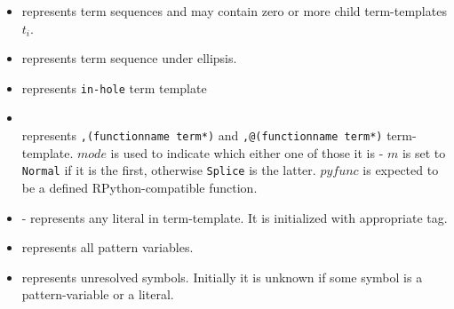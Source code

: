 \begin{itemize}
\item \TermSequence \space represents term sequences and may contain zero or more child term-templates $t_i$.
\item \TermRepeat \space represents term sequence under ellipsis.
\item \TermInHole \space represents \texttt{in-hole} term template
\item \PythonCall \\ represents \texttt{,(functionname term*)} and \texttt{,@(functionname term*)} term-template. $mode$ is used to indicate which either one of those it is - $m$ is set to \texttt{Normal} if it is the first, otherwise \texttt{Splice} is the latter. $pyfunc$ is expected to be a defined RPython-compatible function.
\item \TermLiteral - represents any literal in term-template. It is initialized with appropriate tag.
\item \PatternVariable \space represents all pattern variables.
\item \UnresolvedSymbol \space represents unresolved symbols. Initially it is unknown if some symbol is a pattern-variable or a literal.
\end{itemize}

